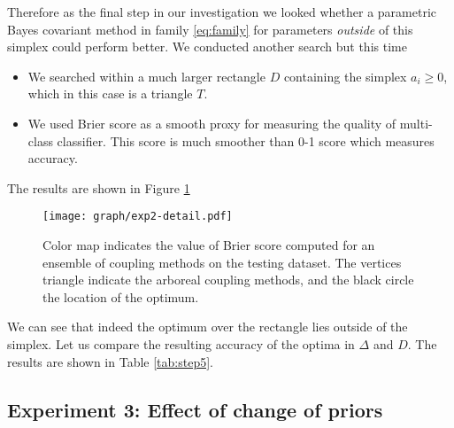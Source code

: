 \documentclass[twoside,11pt]{article}
\begin{document}
Therefore as the final step in our investigation we looked whether a parametric Bayes covariant method in family \eqref{eq:family} for parameters \emph{outside} of this simplex could perform better. We conducted another search but this time
\begin{itemize}
	\item We searched within a much larger rectangle $D$ containing the simplex $a_i\geq 0$, which in this case is a triangle $T$.
	\item We used Brier score as a smooth proxy for measuring the quality of multi-class classifier. This score is much smoother than 0-1 score which measures accuracy.
\end{itemize}

The results are shown in Figure \ref{fig:score}


\begin{figure}[!ht]
	\texttt{[image: graph/exp2-detail.pdf]}
	\caption{Color map indicates the value of Brier score computed for an ensemble of coupling methods on the testing dataset. The vertices triangle indicate the arboreal coupling methods, and the black circle the location of the optimum.}
	\label{fig:score}
\end{figure}

We can see that indeed the optimum over the rectangle lies outside of the simplex. Let us compare the resulting accuracy of the optima in $\Delta$ and $D$. The results are shown in Table \ref{tab:step5}.



\subsection{Experiment 3: Effect of change of priors}  \label{sec:exp3}




%

\end{document}
